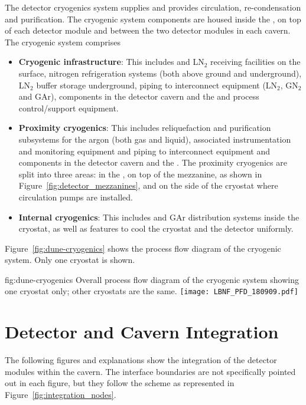 The detector cryogenics system supplies  and provides
circulation, re-condensation and purification. The cryogenic system
components are housed inside the , on top of each detector module
and between the two detector modules in each cavern. The cryogenic system comprises
\begin{itemize}
\item {\bf Cryogenic infrastructure}: This includes  and LN$_2$ receiving
  facilities on the surface, nitrogen refrigeration systems (both
  above ground and underground), LN$_2$ buffer storage
  underground, piping to interconnect equipment (LN$_2$, GN$_2$ and GAr),
  components in the detector cavern and the  and process control/support
  equipment.
\item {\bf Proximity cryogenics}: This includes reliquefaction 
  and purification subsystems for the argon (both gas and liquid), associated
  instrumentation and monitoring equipment and  piping to
  interconnect equipment and components in the detector cavern and the
  . The proximity cryogenics are split into three areas: in the
  , on top of the mezzanine, as shown in Figure~\ref{fig:detector_mezzanines},
  and on the side of the cryostat where  circulation pumps are installed.
\item {\bf Internal cryogenics}: This includes  and GAr distribution
  systems inside the cryostat, as well as features to cool the
  cryostat and the detector uniformly.
\end{itemize}
Figure~\ref{fig:dune-cryogenics} shows the process flow diagram of the
 cryogenic system. Only one cryostat is shown.
\begin{dunefigure}{fig:dune-cryogenics}
  {Overall process flow diagram of the cryogenic system showing one
    cryostat only; other cryostats are the same.}
  \texttt{[image: LBNF\_PFD\_180909.pdf]}
\end{dunefigure}


\section{Detector and Cavern Integration}
\label{sec:fdsp-coord-det-cav-integ}
The following figures and explanations show the
integration of the detector modules within the cavern. The interface
boundaries are not specifically pointed out in each figure, but they
follow the scheme as represented in Figure~\ref{fig:integration_nodes}.

